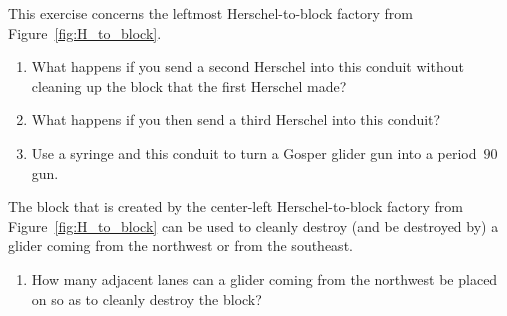 \begin{multicols}{2}
	
	
	
	\mfilbreak
	
	
	\begin{problem}\label{exer:block_factory_is_tripler}
		This exercise concerns the leftmost Herschel-to-block factory from Figure~\ref{fig:H_to_block}.\smallskip
		
		\begin{enumerate}[label=\bf\color{ocre}(\alph*)]
			\item What happens if you send a second Herschel into this conduit without cleaning up the block that the first Herschel made?
			
			\item What happens if you then send a third Herschel into this conduit?
			
			\item Use a syringe and this conduit to turn a Gosper glider gun into a period~$90$ gun.
		\end{enumerate}
	\end{problem}
	
	
	\mfilbreak
	
	
	\begin{problem}\label{exer:block_factory_block_gliders}
		The block that is created by the center-left Herschel-to-block factory from Figure~\ref{fig:H_to_block} can be used to cleanly destroy (and be destroyed by) a glider coming from the northwest or from the southeast.
		
		\begin{enumerate}[label=\bf\color{ocre}(\alph*)]
			\item How many adjacent lanes can a glider coming from the northwest be placed on so as to cleanly destroy the block?
			

\end{enumerate}
\end{problem}
\end{multicols}
